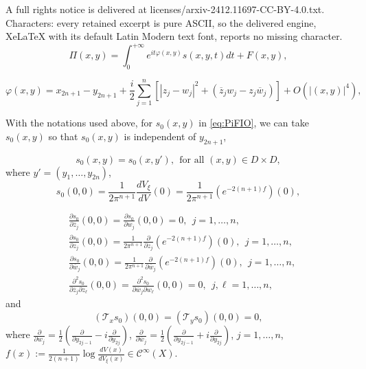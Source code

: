 \documentclass[10pt,a4paper]{amsart}
\def\cC{\mathscr{C}}
\newcommand{\ol}{\overline}
\newcommand{\pr}{\partial}
\begin{document}
A full rights notice is delivered at licenses/arxiv-2412.11697-CC-BY-4.0.txt. Characters: every retained excerpt is pure ASCII, so the delivered engine, XeLaTeX with its default Latin Modern text font, reports no missing character.
\begin{equation}\label{eq:PiFIO}
\Pi(x,y)=\int_0^{+\infty} 
e^{it\varphi(x,y)}s(x,y,t)dt+F(x,y),
\end{equation}

\begin{equation}\label{e-gue241220yydp}
\varphi(x,y)=x_{2n+1}-y_{2n+1}+\frac{i}{2}\sum_{j=1}^n\left[|z_j-w_j|^2+(\overline{z}_jw_j-z_j\overline{w}_j)\right]+O\left(|(x,y)|^4\right), 
\end{equation}

\begin{lemma}
With the notations used above, for $s_0(x,y)$ in \eqref{eq:PiFIO}, we
can take $s_0(x,y)$ so that $s_0(x,y)$ is independent of $y_{2n+1}$, 

\begin{equation}\label{e-gue241128yyd}
s_0(x,y)=s_0(x,y'),\ \ \mbox{for all $(x,y)\in D\times D$},
\end{equation}
where $y'=(y_1,\ldots,y_{2n})$,
\begin{equation}\label{e-gue241120yydg}
s_0(0,0)=\frac{1}{2\pi^{n+1}}\frac{dV_\xi}{dV}(0)=\frac{1}{2\pi^{n+1}}(e^{-2(n+1)f})(0),
\end{equation}

\begin{equation}\label{e-gue241120yydu}
\begin{split}
&\frac{\pr s_0}{\pr\ol z_j}(0,0)=\frac{\pr s_0}{\pr w_j}(0,0)=0,\ \ j=1,\ldots,n,\\
&\frac{\pr s_0}{\pr z_j}(0,0)=\frac{1}{2\pi^{n+1}}\frac{\pr}{\pr z_j}(e^{-2(n+1)f})(0),\ \ j=1,\ldots,n,\\
&\frac{\pr s_0}{\pr\ol w_j}(0,0)=\frac{1}{2\pi^{n+1}}\frac{\pr}{\pr\ol w_j}(e^{-2(n+1)f})(0),\ \ j=1,\ldots,n,\\
&\frac{\pr^2s_0}{\pr\ol z_j\pr z_\ell}(0,0)=\frac{\pr^2s_0}{\pr\ol w_j\pr w_\ell}(0,0)=0,\ \ j, \ell=1,\ldots,n,
\end{split}
\end{equation}
and 
\begin{equation}\label{e-gue241125ycd}
(\mathcal{T}_xs_0)(0,0)=(\mathcal{T}_ys_0)(0,0)=0,
\end{equation}
where $\frac{\pr}{\pr w_j}=\frac{1}{2}(\frac{\pr}{\pr y_{2j-1}}-i\frac{\pr}{\pr y_{2j}})$, $\frac{\pr}{\pr\ol w_j}=\frac{1}{2}(\frac{\pr}{\pr y_{2j-1}}+i\frac{\pr}{\pr y_{2j}})$, $j=1,\ldots,n$, $f(x):=\frac{1}{2(n+1)}\log \frac{dV(x)}{dV_\xi(x)}\in\cC^\infty(X)$. 
\end{lemma}
\end{document}
